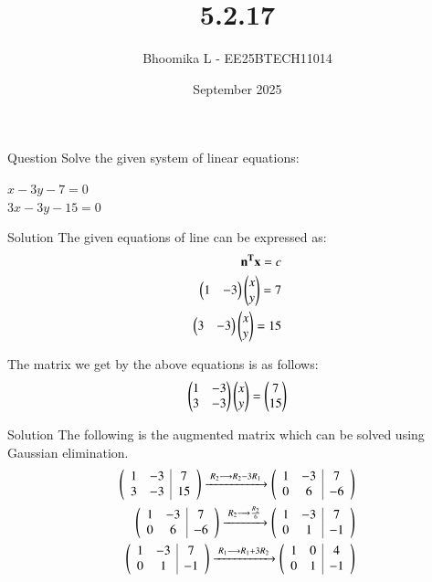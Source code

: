 \documentclass{beamer}
\title %
{5.2.17}
\date{September  2025}
\author %
{Bhoomika L - EE25BTECH11014}
\begin{document}
\frame{\titlepage}
\begin{frame}{Question}
Solve the given system of linear equations:
\begin{center}
    $x-3y-7=0$\\$3x-3y-15=0$
\end{center}
\end{frame}

\begin{frame}{Solution}
The given equations of line can be expressed as:\\
\begin{align}
    \mathbf{n^T}\mathbf{x}=c\\
    \begin{pmatrix}1&-3\end{pmatrix}\begin{pmatrix}x\\y\end{pmatrix}=7\\
 \begin{pmatrix}3 &-3\end{pmatrix}\begin{pmatrix}x\\y\end{pmatrix}=15
 \end{align}

 The matrix we get by the above equations is as follows:
\begin{align}
     \begin{pmatrix}1&-3\\3&-3\end{pmatrix}\begin{pmatrix}x\\y\end{pmatrix}=\begin{pmatrix}7\\15\end{pmatrix}
\end{align}
\end{frame}

\begin{frame}{Solution}
 The following is the augmented matrix which can be solved using Gaussian elimination.
 \begin{align}
       \begin{pmatrix}\begin{array}{cc|c}
1 & -3 & 7 \\ 
3 & -3 & 15\end{array}\end{pmatrix} \xrightarrow{\;R_2\longrightarrow R_2-3R_1\;}       \begin{pmatrix}\begin{array}{cc|c}
1 & -3 & 7 \\ 
0 & 6 & -6\end{array}\end{pmatrix}\\
\begin{pmatrix}\begin{array}{cc|c}
1 & -3 & 7 \\ 
0 & 6 & -6\end{array}\end{pmatrix} \xrightarrow{\;R_2\longrightarrow \frac{R_2}{6}\;}
\begin{pmatrix}\begin{array}{cc|c}
1 & -3 & 7 \\ 
0 & 1 & -1\end{array}\end{pmatrix}\\
\begin{pmatrix}\begin{array}{cc|c}
1 & -3 & 7 \\ 
0 & 1 & -1\end{array}\end{pmatrix} \xrightarrow{\;R_1\longrightarrow R_1+3R_2\;} \begin{pmatrix}\begin{array}{cc|c}
1 & 0 & 4 \\ 
0 & 1 & -1\end{array}\end{pmatrix} 
\end{align}
\end{frame}
\end{document}
